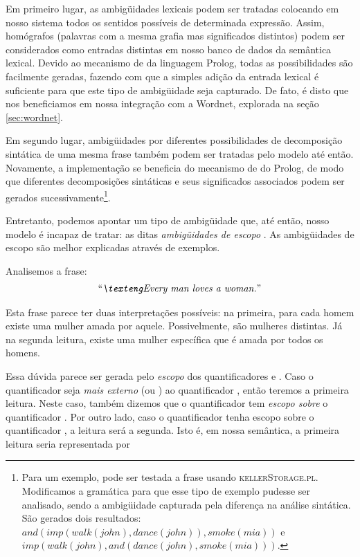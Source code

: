 Em primeiro lugar, as ambigüidades lexicais podem ser tratadas colocando em nosso sistema todos os sentidos possíveis de determinada expressão. Assim, homógrafos (palavras com a mesma grafia mas significados distintos) podem ser considerados como entradas distintas em nosso banco de dados da semântica lexical. Devido ao mecanismo de  da linguagem Prolog, todas as possibilidades são facilmente geradas, fazendo com que a simples adição da entrada lexical é suficiente para que este tipo de ambigüidade seja capturado. De fato, é disto que nos beneficiamos em nossa integração com a Wordnet, explorada na seção \ref{sec:wordnet}.

Em segundo lugar, ambigüidades por diferentes possibilidades de decomposição sintática de uma mesma frase também podem ser tratadas pelo modelo até então. Novamente, a implementação se beneficia do mecanismo de  do Prolog, de modo que diferentes decomposições sintáticas e seus significados associados podem ser gerados sucessivamente\footnote{Para um exemplo, pode ser testada a frase  usando \textsc{kellerStorage.pl}. Modificamos a gramática para que esse tipo de exemplo pudesse ser analisado, sendo a ambigüidade capturada pela diferença na análise sintática. São gerados dois resultados: $and(imp(walk(john),dance(john)),smoke(mia))$ e $imp(walk(john),and(dance(john),smoke(mia)))$.}.\update

Entretanto, podemos apontar um tipo de ambigüidade que, até então, nosso modelo é incapaz de tratar: as ditas \textit{ambigüidades de escopo} \citep[p.~105-109]{BlackburnBos:2005}. As ambigüidades de escopo são melhor explicadas através de exemplos.

Analisemos a frase: 
\begin{align*}
\text{\expreng{Every man loves a woman.}}
\end{align*}%

Esta frase parece ter duas interpretações possíveis: na primeira, para cada homem existe uma mulher amada por aquele. Possivelmente, são mulheres distintas. Já na segunda leitura, existe uma mulher específica que é amada por todos os homens.

\update Essa dúvida parece ser gerada pelo \textit{escopo} dos quantificadores  e . Caso o quantificador  seja \textit{mais externo} (ou \textit{}) ao quantificador , então teremos a primeira leitura. Neste caso, também dizemos que o quantificador  tem \textit{escopo sobre} o quantificador . Por outro lado, caso o quantificador  tenha escopo sobre o quantificador , a leitura será a segunda. Isto é, em nossa semântica, a primeira leitura seria representada por

